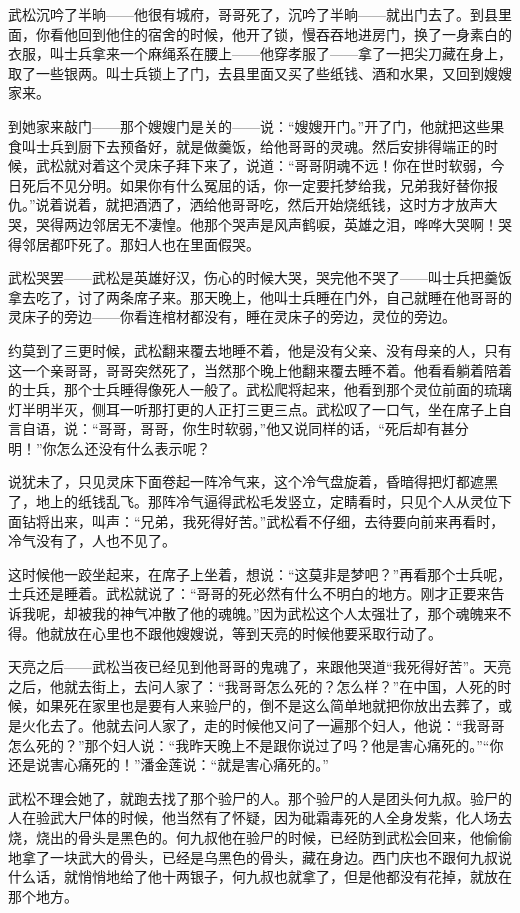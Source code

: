 \par 武松沉吟了半晌——他很有城府，哥哥死了，沉吟了半晌——就出门去了。到县里面，你看他回到他住的宿舍的时候，他开了锁，慢吞吞地进房门，换了一身素白的衣服，叫士兵拿来一个麻绳系在腰上——他穿孝服了——拿了一把尖刀藏在身上，取了一些银两。叫士兵锁上了门，去县里面又买了些纸钱、酒和水果，又回到嫂嫂家来。
\par 到她家来敲门——那个嫂嫂门是关的——说：“嫂嫂开门。”开了门，他就把这些果食叫士兵到厨下去预备好，就是做羹饭，给他哥哥的灵魂。然后安排得端正的时候，武松就对着这个灵床子拜下来了，说道：“哥哥阴魂不远！你在世时软弱，今日死后不见分明。如果你有什么冤屈的话，你一定要托梦给我，兄弟我好替你报仇。”说着说着，就把酒洒了，洒给他哥哥吃，然后开始烧纸钱，这时方才放声大哭，哭得两边邻居无不凄惶。他那个哭声是风声鹤唳，英雄之泪，哗哗大哭啊！哭得邻居都吓死了。那妇人也在里面假哭。
\par 武松哭罢——武松是英雄好汉，伤心的时候大哭，哭完他不哭了——叫士兵把羹饭拿去吃了，讨了两条席子来。那天晚上，他叫士兵睡在门外，自己就睡在他哥哥的灵床子的旁边——你看连棺材都没有，睡在灵床子的旁边，灵位的旁边。
\par 约莫到了三更时候，武松翻来覆去地睡不着，他是没有父亲、没有母亲的人，只有这一个亲哥哥，哥哥突然死了，当然那个晚上他翻来覆去睡不着。他看看躺着陪着的士兵，那个士兵睡得像死人一般了。武松爬将起来，他看到那个灵位前面的琉璃灯半明半灭，侧耳一听那打更的人正打三更三点。武松叹了一口气，坐在席子上自言自语，说：“哥哥，哥哥，你生时软弱，”他又说同样的话，“死后却有甚分明！”你怎么还没有什么表示呢？
\par 说犹未了，只见灵床下面卷起一阵冷气来，这个冷气盘旋着，昏暗得把灯都遮黑了，地上的纸钱乱飞。那阵冷气逼得武松毛发竖立，定睛看时，只见个人从灵位下面钻将出来，叫声：“兄弟，我死得好苦。”武松看不仔细，去待要向前来再看时，冷气没有了，人也不见了。
\par 这时候他一跤坐起来，在席子上坐着，想说：“这莫非是梦吧？”再看那个士兵呢，士兵还是睡着。武松就说了：“哥哥的死必然有什么不明白的地方。刚才正要来告诉我呢，却被我的神气冲散了他的魂魄。”因为武松这个人太强壮了，那个魂魄来不得。他就放在心里也不跟他嫂嫂说，等到天亮的时候他要采取行动了。
\par 天亮之后——武松当夜已经见到他哥哥的鬼魂了，来跟他哭道“我死得好苦”。天亮之后，他就去街上，去问人家了：“我哥哥怎么死的？怎么样？”在中国，人死的时候，如果死在家里也是要有人来验尸的，倒不是这么简单地就把你放出去葬了，或是火化去了。他就去问人家了，走的时候他又问了一遍那个妇人，他说：“我哥哥怎么死的？”那个妇人说：“我昨天晚上不是跟你说过了吗？他是害心痛死的。”“你还是说害心痛死的！”潘金莲说：“就是害心痛死的。”
\par 武松不理会她了，就跑去找了那个验尸的人。那个验尸的人是团头何九叔。验尸的人在验武大尸体的时候，他当然有了怀疑，因为砒霜毒死的人全身发紫，化人场去烧，烧出的骨头是黑色的。何九叔他在验尸的时候，已经防到武松会回来，他偷偷地拿了一块武大的骨头，已经是乌黑色的骨头，藏在身边。西门庆也不跟何九叔说什么话，就悄悄地给了他十两银子，何九叔也就拿了，但是他都没有花掉，就放在那个地方。
